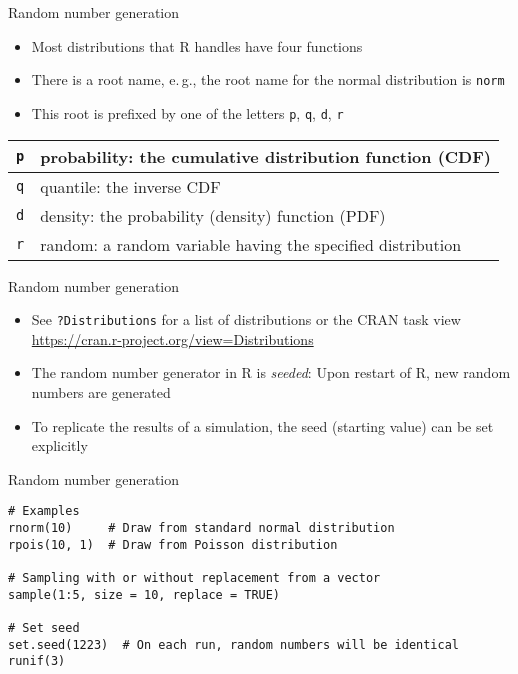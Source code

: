 \documentclass[aspectratio=169]{beamer}
\begin{document}
\begin{frame}{Random number generation}
  \begin{itemize}
    \item Most distributions that R handles have four functions
    \item There is a root name, e.\,g., the root name for the normal
      distribution is \texttt{norm} 
    \item This root is prefixed by one of the letters
      \texttt{p}, \texttt{q}, \texttt{d}, \texttt{r}
  \end{itemize}

  \vspace{.2cm}
  \begin{center}
{\renewcommand{\arraystretch}{1.5}
  \begin{tabular}{c|l}
    \texttt{p} & probability: the cumulative distribution function
    (CDF)\\
    \hline
    \texttt{q} & quantile: the inverse CDF\\
    \hline
    \texttt{d} & density: the probability (density) function (PDF)\\
    \hline
    \texttt{r} & random: a random variable having the specified
    distribution\\
  \end{tabular}
}
  \end{center}
\end{frame}


\begin{frame}{Random number generation}
  \begin{itemize}
    \item See \texttt{?Distributions} for a list of distributions or the
      CRAN task view \url{https://cran.r-project.org/view=Distributions}
    \item The random number generator in R is {\em seeded}: Upon restart
      of R, new random numbers are generated
    \item To replicate the results of a simulation, the seed (starting
      value) can be set explicitly
  \end{itemize}
\end{frame}


\begin{frame}[fragile]{Random number generation}
\begin{lstlisting}
# Examples
rnorm(10)     # Draw from standard normal distribution
rpois(10, 1)  # Draw from Poisson distribution

# Sampling with or without replacement from a vector
sample(1:5, size = 10, replace = TRUE)

# Set seed
set.seed(1223)  # On each run, random numbers will be identical
runif(3)
\end{lstlisting}
\end{frame}
\end{document}
